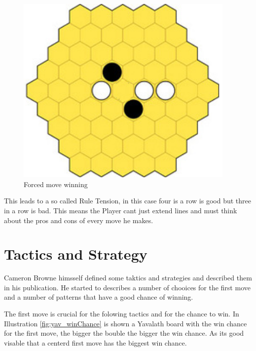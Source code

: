 \documentclass[german]{report}
\begin{document}
\begin{figure}[ht]
\centering
\includegraphics[width=0.95\textwidth]{Abbildungen/yav_forceMove.png}
\caption[Forced move winning, Source:\cite{yvalathHP}]{Forced move winning}
\label{fig:yav_forceMove}
\end{figure}


This leads to a so called Rule Tension, in this case four is a row is good but three in a row is bad. This means the Player cant just extend lines and must think about the pros and cons of every move he makes.\cite{yvalath}

\section{Tactics and Strategy}
Cameron Browne himsself defined some taktics and strategies and described them in his publication. He started to describes a number of chooices for the first move and a number of patterns that have a good chance of winning.


The first move is crucial for the folowing tactics and for the chance to win.
In Illustration \ref{fig:yav_winChance} is shown a Yavalath board with the win chance for the first move, the bigger the bouble the bigger the win chance. As its good visable that a centerd first move has the biggest win chance.\cite{yvalathHP}
\end{document}
